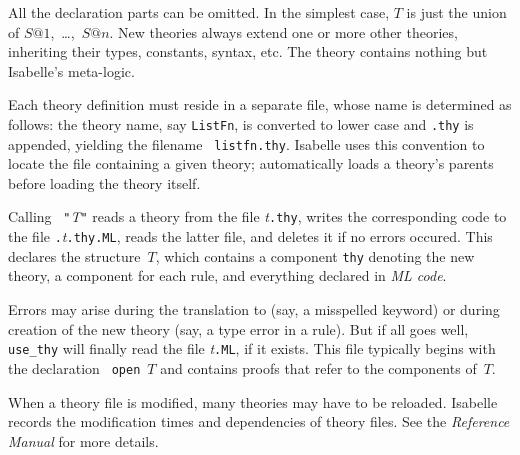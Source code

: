 All the declaration parts can be omitted.  In the simplest case, $T$ is
just the union of $S@1$,~\ldots,~$S@n$.  New theories always extend one
or more other theories, inheriting their types, constants, syntax, etc.
The theory  contains nothing but Isabelle's meta-logic.

Each theory definition must reside in a separate file, whose name is
determined as follows: the theory name, say {\tt ListFn}, is converted to
lower case and {\tt.thy} is appended, yielding the filename {\tt
  listfn.thy}.  Isabelle uses this convention to locate the file containing
a given theory;  automatically loads a theory's
parents before loading the theory itself.

Calling ~{\tt"}{\it T\/}{\tt"} reads a theory from the
file {\it t}{\tt.thy}, writes the corresponding {\ML} code to the file
{\tt.}{\it t}{\tt.thy.ML}, reads the latter file, and deletes it if no errors
occured.  This declares the {\ML} structure~$T$, which contains a component
{\tt thy} denoting the new theory, a component for each rule, and everything
declared in {\it ML code}.

Errors may arise during the translation to {\ML} (say, a misspelled keyword)
or during creation of the new theory (say, a type error in a rule).  But if
all goes well, {\tt use_thy} will finally read the file {\it t}{\tt.ML}, if
it exists.  This file typically begins with the {\ML} declaration {\tt
open}~$T$ and contains proofs that refer to the components of~$T$.

When a theory file is modified, many theories may have to be reloaded.
Isabelle records the modification times and dependencies of theory files.
See the {\em Reference Manual\/}
for more details.


